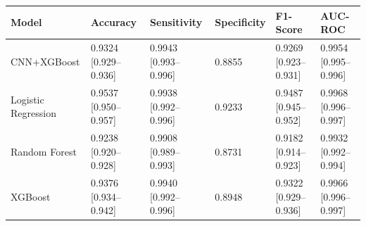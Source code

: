 \begin{tabular}{llllll}
\toprule
Model & Accuracy & Sensitivity & Specificity & F1-Score & AUC-ROC \\
\midrule
CNN+XGBoost & 0.9324 [0.929–0.936] & 0.9943 [0.993–0.996] & 0.8855 & 0.9269 [0.923–0.931] & 0.9954 [0.995–0.996] \\
Logistic Regression & 0.9537 [0.950–0.957] & 0.9938 [0.992–0.996] & 0.9233 & 0.9487 [0.945–0.952] & 0.9968 [0.996–0.997] \\
Random Forest & 0.9238 [0.920–0.928] & 0.9908 [0.989–0.993] & 0.8731 & 0.9182 [0.914–0.923] & 0.9932 [0.992–0.994] \\
XGBoost & 0.9376 [0.934–0.942] & 0.9940 [0.992–0.996] & 0.8948 & 0.9322 [0.929–0.936] & 0.9966 [0.996–0.997] \\
\bottomrule
\end{tabular}
